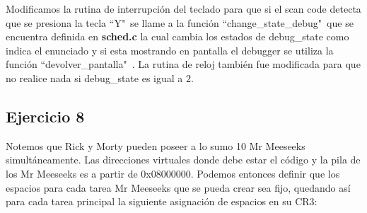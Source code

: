 \documentclass[a4paper]{article}
\begin{document}

\justify
Modificamos la rutina de interrupción del teclado para que si el scan code detecta que se presiona la tecla ``Y"\ se llame a la función ``change_state_debug"\ que se encuentra definida en \textbf{sched.c} la cual cambia los estados de debug_state como indica el enunciado y si esta mostrando en pantalla el debugger se utiliza la función ``devolver_pantalla"\ . La rutina de reloj también fue modificada para que no realice nada si debug_state es igual a $2$.


\subsection{Ejercicio 8}
\justify
Notemos que Rick y Morty pueden poseer a lo sumo 10 Mr Meeseeks simultáneamente. Las direcciones virtuales donde debe estar el código y la pila de los Mr Meeseeks es a partir de 0x08000000. Podemos entonces definir que los espacios para cada tarea Mr Meeseeks que se pueda crear sea fijo, quedando así para cada tarea principal la siguiente asignación de espacios en su CR3:
\end{document}
